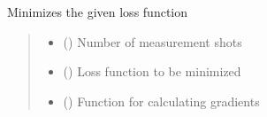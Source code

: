 \documentclass[letterpaper,10pt,english]{sphinxmanual}
\begin{document}
\begin{fulllineitems}
\begin{fulllineitems}
\label{\detokenize{qcompute_qapp.optimizer:qcompute_qapp.optimizer.SLSQP.minimize}}
\pysigstartsignatures
{}
\pysigstopsignatures
\sphinxAtStartPar
Minimizes the given loss function
\begin{quote}\begin{description}
\begin{itemize}
\item {} 
\sphinxAtStartPar
{} () \textendash{} Number of measurement shots

\item {} 
\sphinxAtStartPar
{} (\sphinxstyleliteralemphasis{\sphinxupquote{{[}}}\sphinxstyleliteralemphasis{\sphinxupquote{{[}}}\sphinxstyleliteralemphasis{\sphinxupquote{, }}\sphinxstyleliteralemphasis{\sphinxupquote{{]}}}\sphinxstyleliteralemphasis{\sphinxupquote{, }}\sphinxstyleliteralemphasis{\sphinxupquote{{]}}}) \textendash{} Loss function to be minimized

\item {} 
\sphinxAtStartPar
{} (\sphinxstyleliteralemphasis{\sphinxupquote{{[}}}\sphinxstyleliteralemphasis{\sphinxupquote{{[}}}\sphinxstyleliteralemphasis{\sphinxupquote{, }}\sphinxstyleliteralemphasis{\sphinxupquote{{]}}}\sphinxstyleliteralemphasis{\sphinxupquote{, }}\sphinxstyleliteralemphasis{\sphinxupquote{{]}}}) \textendash{} Function for calculating gradients

\end{itemize}

\end{description}\end{quote}

\end{fulllineitems}


\end{fulllineitems}
\end{document}
